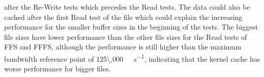 after the \mbox{Re-Write} tests which precedes the Read tests. The data could also be cached after the first Read test of the file which could explain the increasing performance for the smaller buffer sizes in the beginning of the tests. The biggest file sizes have lower performance than the other file sizes for the Read tests of \gls{FFS} and \gls{FFFS}, although the performance is still higher than the maximum bandwidth reference point of \SI[per-mode = symbol]{125\,000}{\kilo\byte\per\second}, indicating that the kernel cache has worse performance for bigger files.


